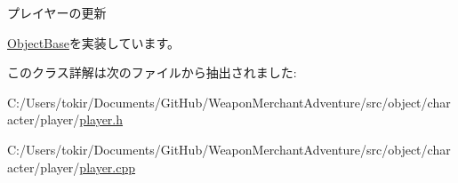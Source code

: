 プレイヤーの更新 



\mbox{\hyperlink{class_object_base_a8b5b72b363a419767efde0b0e692ea95}{Object\+Base}}を実装しています。



このクラス詳解は次のファイルから抽出されました\+:\begin{DoxyCompactItemize}
\item 
C\+:/\+Users/tokir/\+Documents/\+Git\+Hub/\+Weapon\+Merchant\+Adventure/src/object/character/player/\mbox{\hyperlink{player_8h}{player.\+h}}\item 
C\+:/\+Users/tokir/\+Documents/\+Git\+Hub/\+Weapon\+Merchant\+Adventure/src/object/character/player/\mbox{\hyperlink{player_8cpp}{player.\+cpp}}\end{DoxyCompactItemize}
